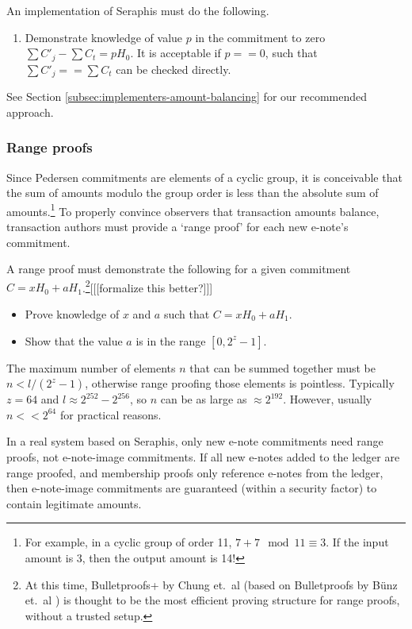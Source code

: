 An implementation of Seraphis must do the following.

\begin{enumerate}
    \item Demonstrate knowledge of value $p$ in the commitment to zero $\sum C'_j - \sum C_t = p H_0$. It is acceptable if $p == 0$, such that $\sum C'_j == \sum C_t$ can be checked directly.
\end{enumerate}

See Section \ref{subsec:implementers-amount-balancing} for our recommended approach.

\subsubsection{Range proofs}
\label{subsubsec:confidential-transactions-range-proofs}

Since Pedersen commitments are elements of a cyclic group, it is conceivable that the sum of amounts modulo the group order is less than the absolute sum of amounts.\footnote{For example, in a cyclic group of order 11, $7 + 7 \mod 11 \equiv 3$. If the input amount is 3, then the output amount is 14!} To properly convince observers that transaction amounts balance, transaction authors must provide a `range proof' for each new e-note's commitment.

A range proof must demonstrate the following for a given commitment $C = x H_0 + a H_1$.\footnote{At this time, Bulletproofs+ by Chung et.\ al \cite{bulletproofs_plus} (based on Bulletproofs by B\"{u}nz et.\ al \cite{Bulletproofs_paper}) is thought to be the most efficient proving structure for range proofs, without a trusted setup.}[[[formalize this better?]]]

\begin{itemize}
    \item Prove knowledge of $x$ and $a$ such that $C = x H_0 + a H_1$.

    \item Show that the value $a$ is in the range $[0, 2^{z} - 1]$.
\end{itemize}

The maximum number of elements $n$ that can be summed together must be $n < l / (2^z - 1)$, otherwise range proofing those elements is pointless. Typically $z = 64$ and $l \approx 2^{252} - 2^{256}$, so $n$ can be as large as $\approx 2^{192}$. However, usually $n << 2^{64}$ for practical reasons.

In a real system based on Seraphis, only new e-note commitments need range proofs, not e-note-image commitments. If all new e-notes added to the ledger are range proofed, and membership proofs only reference e-notes from the ledger, then e-note-image commitments are guaranteed (within a security factor) to contain legitimate amounts.

